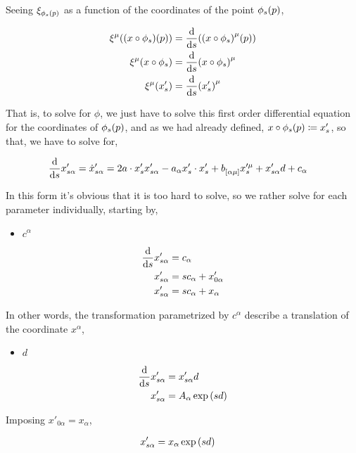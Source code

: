Seeing $\xi_{\phi_s\qty(p)}$ as a function of the coordinates of the point $\phi_s\qty(p)$,

\begin{align*}
    \xi^\mu\qty(\qty(x\circ\phi_s)\qty(p))&=\dv{}{s}\qty(\qty(x\circ\phi_{s})^\mu(p))\\
    \xi^\mu\qty(x\circ\phi_s)&=\dv{}{s}\qty(x\circ\phi_{s})^\mu\\
    \xi^\mu\qty(x'_s)&=\dv{}{s}\qty(x'_s)^\mu
\end{align*}

That is, to solve for $\phi$, we just have to solve this first order differential equation for the coordinates of $\phi_s\qty(p)$, and 
as we had already defined, $x\circ\phi_s\qty(p)\coloneq x'_s$, so that, we have to solve for,

\begin{align*}
    \dv{}{s}x'_{s\alpha}={\dot x}'_{s\alpha}&=2a\cdot x'_s x'_{s\alpha}-a_\alpha x'_s\cdot x'_s+\tensor{b}{_{[\alpha}_{\mu]}}x'^\mu_s+x'_{s\alpha} d+c_\alpha
\end{align*}

In this form it's obvious that it is too hard to solve, so we rather solve for each parameter individually, starting by,

\begin{itemize}
    \item $c^\alpha$
\end{itemize}

\begin{align*}
    \dv{}{s}x'_{s\alpha}&=c_\alpha\\
    x'_{s\alpha}&=sc_\alpha+x'_{0\alpha}\\
    x'_{s\alpha}&=sc_\alpha+x_\alpha
\end{align*}

In other words, the transformation parametrized by $c^\alpha$ describe a translation of the coordinate $x^\alpha$,

\begin{itemize}
    \item $d$
\end{itemize}

\begin{align*}
    \dv{}{s}x'_{s\alpha}&=x'_{s\alpha} d\\
    x'_{s\alpha}&=A_\alpha\exp\qty(sd)
\end{align*}

Imposing $x'_{0\alpha}=x_\alpha$,

\begin{align*}
    x'_{s\alpha}&=x_\alpha\exp\qty(sd)
\end{align*}

